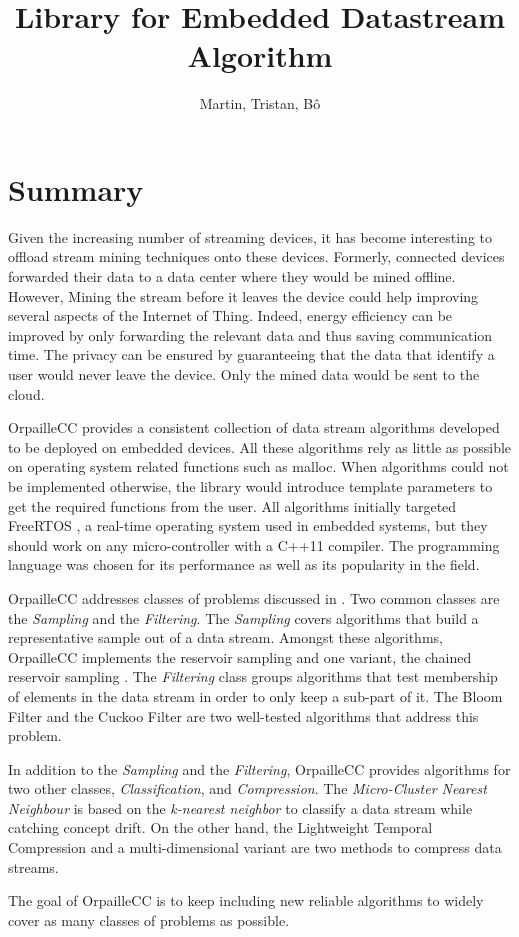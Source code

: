 \documentclass{article}
\title{Library for Embedded Datastream Algorithm}
\author{Martin, Tristan, Bô}
\begin{document}
\maketitle
\section{Summary}
Given the increasing number of streaming devices, it has become interesting to
offload stream mining techniques onto these devices. Formerly, connected
devices forwarded their data to a data center where they would be mined
offline.  However, Mining the stream before it leaves the device could help
improving several aspects of the Internet of Thing. Indeed, energy efficiency
can be improved by only forwarding the relevant data and thus saving
communication time. The privacy can be ensured by guaranteeing that the data that
identify a user would never leave the device. Only the mined data would be sent
to the cloud.

OrpailleCC provides a consistent collection of data stream algorithms developed
to be deployed on embedded devices.  All these algorithms rely as little as
possible on operating system related functions such as malloc. When algorithms
could not be implemented otherwise, the library would introduce template
parameters to get the required functions from the user.  All algorithms
initially targeted FreeRTOS \cite{freertos}, a real-time operating system used
in embedded systems, but they should work on any micro-controller with a C++11
compiler. The programming language was chosen for its performance as well as
its popularity in the field.

OrpailleCC addresses classes of problems discussed in \cite{kejariwal2015}. Two
common classes are the \textit{Sampling} and the \textit{Filtering}.  The
\textit{Sampling} covers algorithms that build a representative sample out of a
data stream. Amongst these algorithms, OrpailleCC implements the reservoir
sampling \cite{reservoir_sampling} and one variant, the chained reservoir
sampling \cite{chained_reservoir_sampling}.  The \textit{Filtering} class
groups algorithms that test membership of elements in the data stream in order
to only keep a sub-part of it. The Bloom Filter \cite{bloom} and the Cuckoo
Filter \cite{cuckoo_filter} are two well-tested algorithms that address this
problem.

In addition to the \textit{Sampling} and the \textit{Filtering}, OrpailleCC
provides algorithms for two other classes, \textit{Classification}, and
\textit{Compression}. The \textit{Micro-Cluster Nearest Neighbour} \cite{mc-nn}
is based on the \textit{k-nearest neighbor} to classify a data stream while
catching concept drift.  On the other hand, the Lightweight Temporal
Compression \cite{ltc} and a multi-dimensional variant \cite{ltcd} are two
methods to compress data streams.

The goal of OrpailleCC is to keep including new reliable algorithms to widely
cover as many classes of problems as possible.


\end{document}
